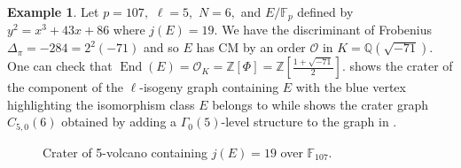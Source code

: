 \documentclass[11pt,a4paper]{amsart}
\theoremstyle{plain}
\theoremstyle{definition}
\newtheorem{eg}[thm]{Example}
\theoremstyle{remark}
\DeclareMathOperator{\Endo}{End}
\begin{document}
\begin{eg}\label{eg:example-1}
  Let $p = 107,$ $\ell = 5,$ $N = 6,$ and $E/\mathbb{F}_p$ defined by $y^2 = x^3 + 43x + 86$ where $j(E) = 19.$ We have the discriminant of Frobenius $\Delta_{\pi} = -284 = 2^2(-71)$ and so $E$ has CM by an order $\mathcal{O}$  in $K = \mathbb{Q}(\sqrt{-71}).$ One can check that $\Endo(E) = \mathcal{O}_K = \mathbb{Z}[\Phi] = \mathbb{Z}\left[\frac{1+\sqrt{-71}}{2}\right].$  shows the crater of the component of the $\ell$-isogeny graph containing $E$ with the blue vertex highlighting the isomorphism class $E$ belongs to while
 shows the crater graph $C_{5,0}(6)$ obtained by adding a $\Gamma_0(5)$-level structure to the graph in .
\begin{figure}
  \centering
  \caption{Crater of 5-volcano containing $j(E) = 19$ over
    $\mathbb{F}_{107}.$}\label{fig:eg-ell-crater-j19}
\end{figure}


\end{eg}
\end{document}
